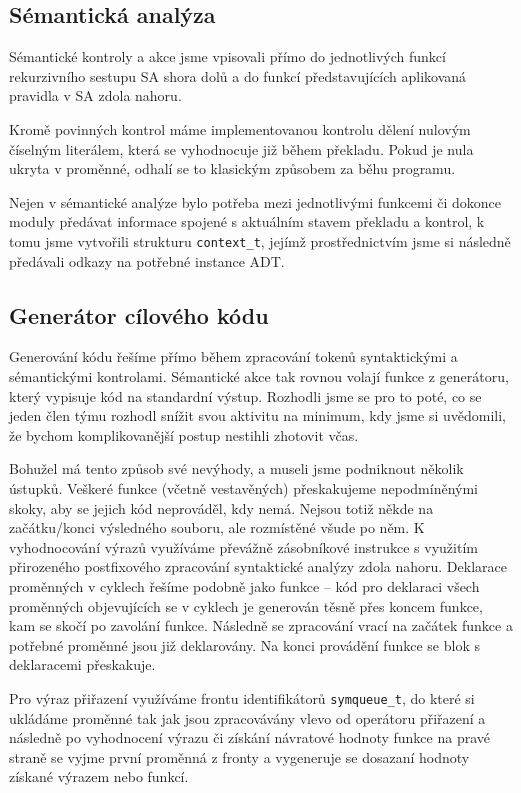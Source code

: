 \documentclass[11pt,a4paper]{article}
\begin{document}
    \subsection{Sémantická analýza}
    Sémantické kontroly a akce jsme vpisovali přímo do jednotlivých funkcí rekurzivního sestupu SA shora dolů a do funkcí představujících aplikovaná pravidla v SA zdola nahoru.
    
    Kromě povinných kontrol máme implementovanou kontrolu dělení nulovým číselným literálem, která se vyhodnocuje již během překladu. Pokud je nula ukryta v proměnné, odhalí se to klasickým způsobem za běhu programu.
    
    Nejen v sémantické analýze bylo potřeba mezi jednotlivými funkcemi či dokonce moduly předávat informace spojené s aktuálním stavem překladu a kontrol, k tomu jsme vytvořili strukturu \texttt{context\_t}, jejímž prostřednictvím jsme si následně předávali odkazy na potřebné instance ADT.
    
    \subsection{Generátor cílového kódu}
    Generování kódu řešíme přímo během zpracování tokenů syntaktickými a sémantickými kontrolami. Sémantické akce tak rovnou volají funkce z generátoru, který vypisuje kód na standardní výstup. Rozhodli jsme se pro to poté, co se jeden člen týmu rozhodl snížit svou aktivitu na minimum, kdy jsme si uvědomili, že bychom komplikovanější postup nestihli zhotovit včas.
    
    Bohužel má tento způsob své nevýhody, a museli jsme podniknout několik ústupků. Veškeré funkce (včetně vestavěných) přeskakujeme nepodmíněnými skoky, aby se jejich kód neprováděl, kdy nemá. Nejsou totiž někde na začátku/konci výsledného souboru, ale rozmístěné všude po něm. K vyhodnocování výrazů využíváme převážně zásobníkové instrukce s využitím přirozeného postfixového zpracování syntaktické analýzy zdola nahoru. Deklarace proměnných v cyklech řešíme podobně jako funkce -- kód pro deklaraci všech proměnných objevujících se v cyklech je generován těsně přes koncem funkce, kam se skočí po zavolání funkce. Následně se zpracování vrací na začátek funkce a potřebné proměnné jsou již deklarovány. Na konci provádění funkce se blok s deklaracemi přeskakuje.
    
    Pro výraz přiřazení využíváme frontu identifikátorů \texttt{symqueue\_t}, do které si ukládáme proměnné tak jak jsou zpracovávány vlevo od operátoru přiřazení a následně po vyhodnocení výrazu či získání návratové hodnoty funkce na pravé straně se vyjme první proměnná z fronty a vygeneruje se dosazaní hodnoty získané výrazem nebo funkcí.
    
\end{document}
